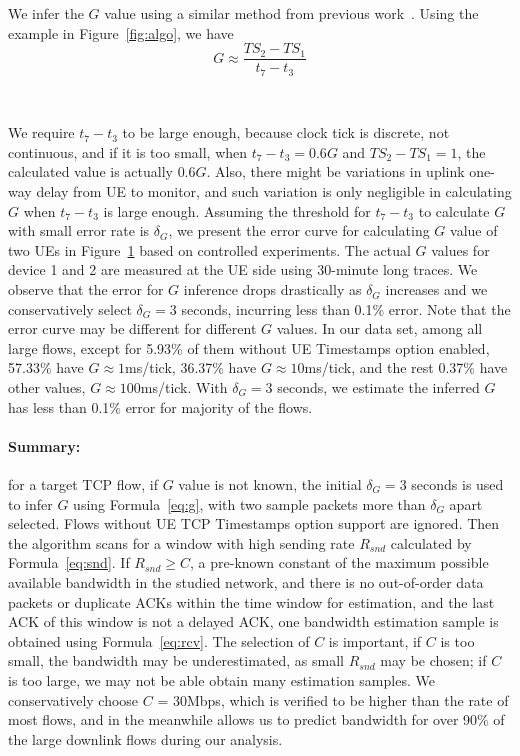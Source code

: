 We infer the $G$ value using a similar method from previous work~\cite{imc.ttfb}. Using the example in Figure~\ref{fig:algo}, we have
\begin{equation}
\label{eq:g}
G \approx \frac{TS_{2} - TS_{1}}{t_{7}-t_{3}}
\end{equation}

\begin{figure}[t]
\centering
{}\\
\label{fig:g}
\end{figure}


We require $t_{7} - t_{3}$ to be large enough, because clock tick is discrete, not continuous, and if it is too small, \eg when $t_{7} - t_{3} = 0.6G$ and $TS_{2} - TS_{1} = 1$, the calculated value is actually $0.6G$. Also, there might be variations in uplink one-way delay from UE to monitor, and such variation is only negligible in calculating $G$ when $t_{7} - t_{3}$ is large enough. Assuming the threshold for $t_{7} - t_{3}$ to calculate $G$ with small error rate is $\delta_{G}$, we present the error curve for calculating $G$ value of two UEs in Figure~\ref{fig:g} based on controlled experiments. The actual $G$ values for device 1 and 2 are measured at the UE side using 30-minute long traces. We observe that the error for $G$ inference drops drastically as $\delta_{G}$ increases and we conservatively select $\delta_{G} = 3$ seconds, incurring less than 0.1\% error. Note that the error curve may be different for different $G$ values. In our data set, among all large flows, except for 5.93\% of them without UE Timestamps option enabled, 57.33\% have $G\approx 1$ms/tick,  36.37\% have $G\approx 10$ms/tick, and the rest 0.37\% have other values, \eg $G\approx 100$ms/tick. With $\delta_{G} = 3$ seconds, we estimate the inferred $G$ has less than 0.1\% error for majority of the flows.

\paragraph{Summary: } for a target TCP flow, if $G$ value is not known, the initial $\delta_{G} = 3$ seconds is used to infer $G$ using Formula~\ref{eq:g}, with two sample packets more than $\delta_{G}$ apart selected. Flows without UE TCP Timestamps option support are ignored. Then the algorithm scans for a window with high sending rate $R_{snd}$ calculated by Formula~\ref{eq:snd}. If $R_{snd} \geq C$, a pre-known constant of the maximum possible available bandwidth in the studied network, and there is no out-of-order data packets or duplicate ACKs within the time window for estimation, and the last ACK of this window is not a delayed ACK, one bandwidth estimation sample is obtained using Formula~\ref{eq:rcv}. The selection of $C$ is important, \ie if $C$ is too small, the bandwidth may be underestimated, as small $R_{snd}$ may be chosen; if $C$ is too large, we may not be able obtain many estimation samples. We conservatively choose $C$ = 30Mbps, which is verified to be higher than the rate of most flows, and in the meanwhile allows us to predict bandwidth for over 90\% of the large downlink flows during our analysis.

